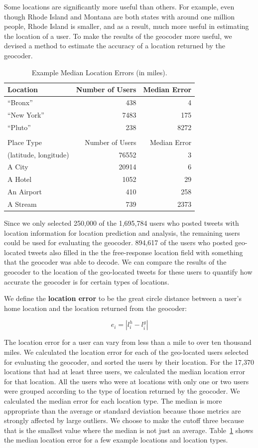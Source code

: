 Some locations are significantly more useful than others.
For example, even though Rhode Island and Montana are both states with around
one million people, Rhode Island is smaller, and as a result, much more useful
in estimating the location of a user.
To make the results of the geocoder more useful, we devised a method to
estimate the accuracy of a location returned by the geocoder.

\begin{table}[tb]
\centering
\caption{Example Median Location Errors (in miles).}
\begin{tabular}{l r r}
Location&Number of Users&Median Error\\ \hline
``Bronx''&438&4\\
``New York''&7483&175\\
``Pluto''&238&8272\\ \hline
\\
Place Type&Number of Users&Median Error\\ \hline
(latitude, longitude)&76552&3\\
A City&20914&6\\
A Hotel&1052&29\\
An Airport&410&258\\
A Stream&739&2373\\
\hline\end{tabular}
\label{tab:MedianLocErr}
\end{table}

Since we only selected 250,000 of the 1,695,784 users who posted tweets with
location information for location prediction and analysis, the remaining users
could be used for evaluating the geocoder.
%
894,617 of the users who posted geo-located tweets also filled in the
the free-response location field with something that the geocoder was able to
decode.
%
We can compare the results of the geocoder to the location of the geo-located
tweets for these users to quantify how accurate the geocoder is for certain
types of locations.


We define the \textbf{location error} to be the great circle distance between a
user's home location and the location returned from the geocoder:

\[
e_i = |l^h_i - l^g_i|
\]

The location error for a user can vary from less than a mile to over ten
thousand miles.
%
We calculated the location error for each of the geo-located users selected for
evaluating the geocoder, and sorted the users by their location.
%
For the 17,370 locations that had at least three users, we calculated the median
location error for that location.
%
All the users who were at locations with only one or two users were grouped
according to the type of location returned by the geocoder.
%
We calculated the median error for each location type.
%
The median is more appropriate than the average or standard deviation because
those metrics are strongly affected by large outliers.
%
We choose to make the cutoff three because that is the smallest value where the
median is not just an average.
Table~\ref{tab:MedianLocErr} shows the median location error for a few example
locations and location types.

